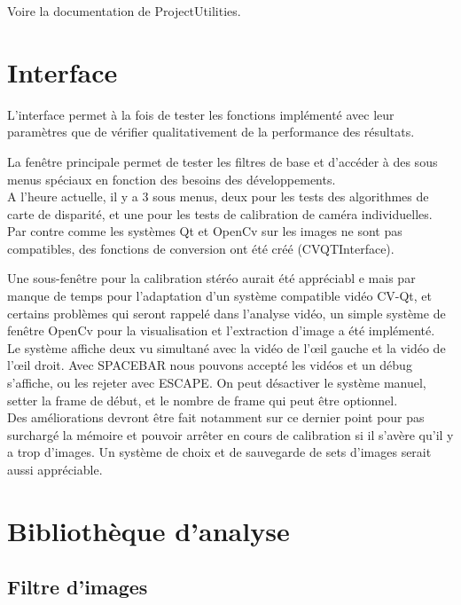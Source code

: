 \documentclass{article}
\begin{document}
Voire la documentation de ProjectUtilities.\\

\newpage
\section{Interface}

L'interface permet à la fois de tester les fonctions implémenté avec leur paramètres que de vérifier qualitativement de la performance des résultats.

La fenêtre principale permet de tester les filtres de base et d'accéder à des sous menus spéciaux en fonction des besoins des développements.\\

A l'heure actuelle, il y a 3 sous menus, deux pour les tests des algorithmes de carte de disparité, et une pour les tests de calibration de caméra individuelles.\\

Par contre comme les systèmes Qt et OpenCv sur les images ne sont pas compatibles, des fonctions de conversion ont été créé (CVQTInterface).

Une sous-fenêtre pour la calibration stéréo aurait été appréciabl e mais par manque de temps pour l'adaptation d'un système compatible vidéo CV-Qt, et certains problèmes qui seront rappelé dans l'analyse vidéo, un simple système de fenêtre OpenCv pour la visualisation et l'extraction d'image a été implémenté.\\
Le système affiche deux vu simultané avec la vidéo de l’œil gauche et la vidéo de l’œil droit. Avec SPACEBAR nous pouvons accepté les vidéos et un débug s'affiche, ou les rejeter avec ESCAPE.
On peut désactiver le système manuel, setter la frame de début, et le nombre de frame qui peut être optionnel.\\

Des améliorations devront être fait notamment sur ce dernier point pour pas surchargé la mémoire et pouvoir arrêter en cours de calibration si il s’avère qu'il y a trop d'images.
Un système de choix et de sauvegarde de sets d'images serait aussi appréciable. 

\newpage
\section{Bibliothèque d'analyse}

\subsection{Filtre d'images}
\end{document}
